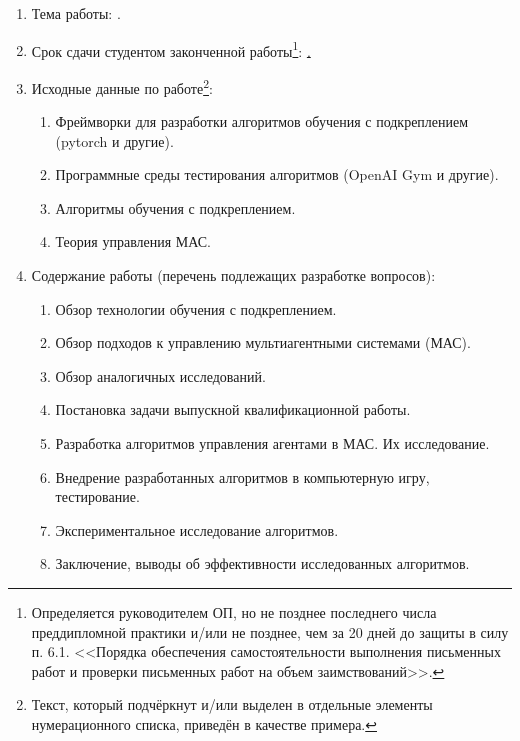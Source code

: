 \begin{enumerate}[1.]
	\item Тема работы: {\expandafter \ulined \thesisTitle.}
	\item Срок сдачи студентом законченной работы\footnote{Определяется руководителем ОП, но не позднее последнего числа преддипломной практики и/или не позднее, чем за 20 дней до защиты в силу п. 6.1. <<Порядка обеспечения самостоятельности выполнения письменных работ и проверки письменных работ на объем заимствований>>.}: \uline{\thesisDeadline.} 
	\item Исходные данные по работе\footnote{Текст, который подчёркнут и/или выделен в отдельные элементы нумерационного списка, приведён в качестве примера.}:
	\begin{enumerate}[label=\theenumi\arabic*.]
		\item Фреймворки для разработки алгоритмов обучения с подкреплением (pytorch и другие).
		\item Программные среды тестирования алгоритмов (OpenAI Gym и другие).
		\item Алгоритмы обучения с подкреплением.
		\item Теория управления МАС.
	\end{enumerate}
	\item Содержание работы (перечень подлежащих разработке вопросов):
	\begin{enumerate}[label=\theenumi\arabic*.]
		\item Обзор технологии обучения с подкреплением.
		\item Обзор подходов к управлению мультиагентными системами (МАС).
		\item Обзор аналогичных исследований.
		\item Постановка задачи выпускной квалификационной работы.
		\item Разработка алгоритмов управления агентами в МАС. Их исследование.
		\item Внедрение разработанных алгоритмов в компьютерную игру, тестирование.
		\item Экспериментальное исследование алгоритмов.
		\item Заключение, выводы об эффективности исследованных алгоритмов.

\end{enumerate}
\end{enumerate}
